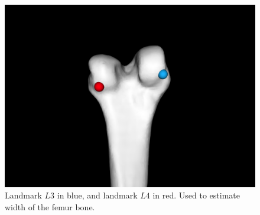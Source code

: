 \documentclass[10pt]{article}
\begin{document}
\begin{figure}[h]
\centering
\includegraphics[scale=0.2]{screenshots/L3blue_L4red_width.png}
\caption{Landmark $L3$ in blue, and landmark $L4$ in red. Used to estimate width of the femur bone.}
\label{fig:landmark_width}
\end{figure}
\end{document}

